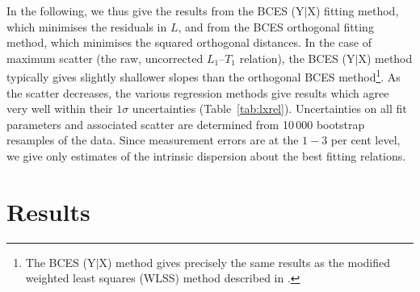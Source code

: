 \documentclass[oldversion]{aa}
\begin{document}
{In the following, we thus give the results from the BCES (Y$|$X) fitting method, which minimises the residuals in $L$, and from the BCES orthogonal fitting method, which minimises the squared orthogonal distances. In the case of maximum scatter (the raw, uncorrected $L_1$--$T_1$ relation), the  BCES (Y$|$X) method typically gives slightly shallower slopes than the orthogonal BCES method\footnote{The BCES (Y$|$X) method gives precisely the same results as the modified weighted least squares (WLSS) method described in \citet{pap06}.}. As the scatter decreases, the various regression methods give results which agree very well within their $1\sigma$ uncertainties (Table~\ref{tab:lxrel}). Uncertainties on all fit parameters and associated scatter are determined from 10\,000 bootstrap resamples of the data. Since measurement errors are at the $1-3$ per cent level, we give only estimates of the intrinsic dispersion about the best fitting relations.


\section{Results}

}
\end{document}
